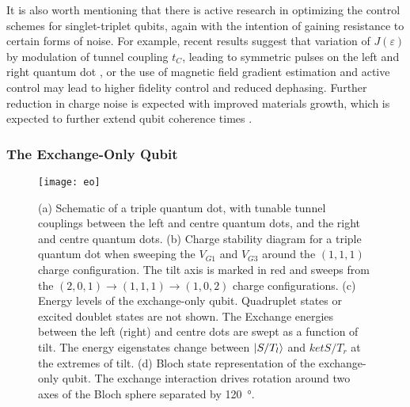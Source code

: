 It is also worth mentioning that there is active research in optimizing the control schemes for singlet-triplet qubits, again with
the intention of gaining resistance to certain forms of noise. For example, recent results suggest that variation of $J(\varepsilon)$ by modulation of
tunnel coupling $t_C$, leading to symmetric pulses on the left and right quantum dot \cite{PhysRevB.73.205302,PhysRevB.97.155402,PhysRevLett.116.116801,PhysRevLett.118.216802},
or the use of magnetic field gradient estimation and active control \cite{ncomms6156,s41534-016-0003-1} may lead to higher
fidelity control and reduced dephasing. Further reduction in charge noise is expected with
improved materials growth, which is expected to further extend qubit coherence times \cite{PhysRevApplied.9.034008}.

\subsubsection{The Exchange-Only Qubit}

\begin{figure}
  \texttt{[image: eo]}
  \caption[Energy levels and eigenstates of an Exchange-Only qubit]
  {\label{fig:eo}(a) Schematic of a triple quantum dot, with tunable tunnel couplings between the left and centre quantum dots, and the
  right and centre quantum dots. (b) Charge stability diagram for a triple quantum dot when sweeping the $V_{G1}$ and $V_{G3}$ around the
  $(1,1,1)$ charge configuration. The tilt axis is marked in red and sweeps from the $(2,0,1) \rightarrow (1,1,1) \rightarrow (1,0,2)$
  charge configurations. (c) Energy levels of the exchange-only qubit. Quadruplet states or excited doublet states are not shown. The Exchange energies
  between the left (right) and centre dots are swept as a function of tilt. The energy eigenstates change between $\ket{S/T_l}$ and $ket{S/T_r}$
  at the extremes of tilt. (d) Bloch state representation of the exchange-only qubit. The exchange interaction drives rotation around two
  axes of the Bloch sphere separated by \SI{120}{\degree}.}
\end{figure}

